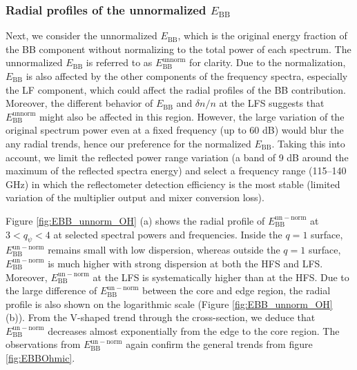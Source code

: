 \subsubsection{Radial profiles of the unnormalized $E_\mathrm{BB}$}

Next, we consider the unnormalized $E_\mathrm{BB}$, which is the original energy fraction of the BB component without normalizing to the total power of each spectrum. The unnormalized $E_\mathrm{BB}$ is referred to as $E_\mathrm{BB}^\mathrm{unnorm}$ for clarity. Due to the normalization, $E_\mathrm{BB}$ is also affected by the other components of the frequency spectra, especially the LF component, which could affect the radial profiles of the BB contribution. Moreover, the different behavior of $E_\mathrm{BB}$ and $\delta n/n$ at the LFS suggests that $E_\mathrm{BB}^\mathrm{unnorm}$ might also be affected in this region. However, the large variation of the original spectrum power even at a fixed frequency (up to 60 dB) would blur the any radial trends, hence our preference for the normalized $E_\mathrm{BB}$. Taking this into account, we limit the reflected power range variation (a band of 9 dB around the maximum of the reflected spectra energy) and select a frequency range (115--140 GHz) in which the reflectometer detection efficiency is the most stable (limited variation of the multiplier output and mixer conversion loss).

Figure \ref{fig:EBB_unnorm_OH} (a) shows the radial profile of $E_\mathrm{BB}^\mathrm{un-norm}$ at $3 < q_{\psi} < 4$ at selected spectral powers and frequencies. Inside the $q = 1$ surface, $E_\mathrm{BB}^\mathrm{un-norm}$ remains small with low dispersion, whereas outside the $q = 1$ surface, $E_\mathrm{BB}^\mathrm{un-norm}$ is much higher with strong dispersion at both the HFS and LFS. Moreover, $E_\mathrm{BB}^\mathrm{un-norm}$ at the LFS is systematically higher than at the HFS. Due to the large difference of $E_\mathrm{BB}^\mathrm{un-norm}$ between the core and edge region, the radial profile is also shown on the logarithmic scale (Figure \ref{fig:EBB_unnorm_OH} (b)). From the V-shaped trend through the cross-section, we deduce that $E_\mathrm{BB}^\mathrm{un-norm}$ decreases almost exponentially from the edge to the core region. The observations from $E_\mathrm{BB}^\mathrm{un-norm}$ again confirm the general trends from figure \ref{fig:EBBOhmic}.

